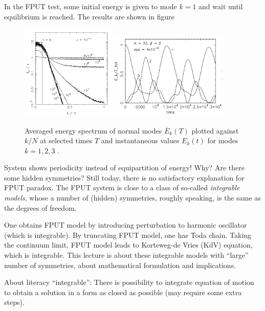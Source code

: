 In the FPUT test, some initial energy is given to mode $k=1$ and wait until equilibrium is reached. The results are shown in figure
\begin{figure}[ht]
	\centering
	\includegraphics[width=0.4\textwidth]{./figs/FPUT-1.png}%
	\includegraphics[width=0.5\textwidth]{./figs/FPUT-2.png}
	\caption{Averaged energy spectrum of normal modes $\bar{E}_k (T)$ plotted against $k/N$ at selected times $T$ and instantaneous values $E_k(t)$ for modes $k=1, 2, 3$ \cite{benettinFermiPastaUlamProblemIts2013}.}
	\label{fig:}
\end{figure}

System shows periodicity instead of equipartition of energy! Why? Are there some hidden symmetries? Still today, there is no satisfactory explanation for FPUT paradox. The FPUT system is close to a class of so-called \textit{integrable models}, whose a number of (hidden) symmetries, roughly speaking, is the same as the degrees of freedom. 

One obtains FPUT model by introducing perturbation to harmonic oscillator (which is integrable). By truncating FPUT model, one has Toda chain. Taking the continuum limit, FPUT model leads to Korteweg-de Vries (KdV) equation, which is integrable. This lecture is about these integrable models with ``large'' number of symmetries, about mathematical formulation and implications.

About literacy ``integrable'': There is possibility to integrate equation of motion to obtain a solution in a form as closed as possible (may require some extra steps).
